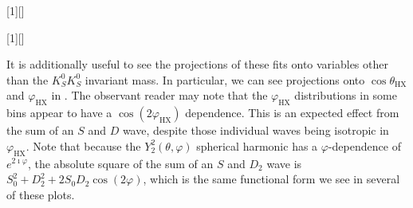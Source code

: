 \clearpage
\begin{table}
\centering
\begingroup
  [1][]{\BODY}
  
\endgroup
\end{table}
\clearpage
\begin{table}
\centering
\begingroup
  [1][]{\BODY}
  
\endgroup
\end{table}

It is additionally useful to see the projections of these fits onto variables other than the $K_S^0K_S^0$ invariant mass. In particular, we can see projections onto $\cos\theta_{\text{HX}}$ and $\varphi_{\text{HX}}$ in . The observant reader may note that the $\varphi_{\text{HX}}$ distributions in some bins appear to have a $\cos\left(2\varphi_{\text{HX}}\right)$ dependence. This is an expected effect from the sum of an $S$ and $D$ wave, despite those individual waves being isotropic in $\varphi_{\text{HX}}$. Note that because the $Y_2^2(\theta, \varphi)$ spherical harmonic has a $\varphi$-dependence of $e^{2\imath\varphi}$, the absolute square of the sum of an $S$ and $D_2$ wave is $S_0^2 + D_2^2 + 2 S_0 D_2 \cos\left(2\varphi\right)$, which is the same functional form we see in several of these plots.

